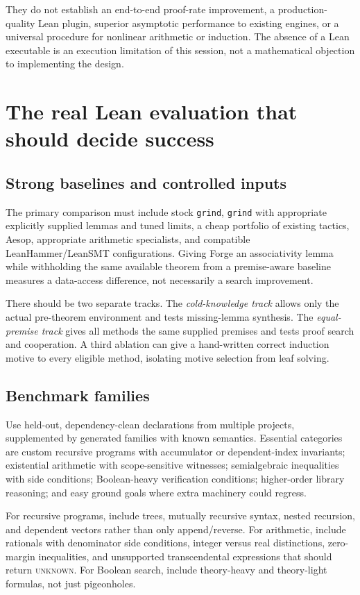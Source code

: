 \documentclass[11pt,letterpaper]{article}
\newcommand{\code}[1]{\texttt{#1}}
\newcommand{\Forge}{\textsf{Forge}}
\newcommand{\Unknown}{\textsc{unknown}}
\theoremstyle{definition}\newtheorem{definition}[theorem]{Definition}
\theoremstyle{remark}\newtheorem{remark}[theorem]{Remark}
\begin{document}
They do not establish an end-to-end proof-rate improvement, a production-quality Lean plugin, superior asymptotic performance to existing engines, or a universal procedure for nonlinear arithmetic or induction. The absence of a Lean executable is an execution limitation of this session, not a mathematical objection to implementing the design.

\section{The real Lean evaluation that should decide success}
\subsection{Strong baselines and controlled inputs}
The primary comparison must include stock \code{grind}, \code{grind} with appropriate explicitly supplied lemmas and tuned limits, a cheap portfolio of existing tactics, Aesop, appropriate arithmetic specialists, and compatible LeanHammer/LeanSMT configurations. Giving \Forge{} an associativity lemma while withholding the same available theorem from a premise-aware baseline measures a data-access difference, not necessarily a search improvement.

There should be two separate tracks. The \emph{cold-knowledge track} allows only the actual pre-theorem environment and tests missing-lemma synthesis. The \emph{equal-premise track} gives all methods the same supplied premises and tests proof search and cooperation. A third ablation can give a hand-written correct induction motive to every eligible method, isolating motive selection from leaf solving.

\subsection{Benchmark families}
Use held-out, dependency-clean declarations from multiple projects, supplemented by generated families with known semantics. Essential categories are custom recursive programs with accumulator or dependent-index invariants; existential arithmetic with scope-sensitive witnesses; semialgebraic inequalities with side conditions; Boolean-heavy verification conditions; higher-order library reasoning; and easy ground goals where extra machinery could regress.

For recursive programs, include trees, mutually recursive syntax, nested recursion, and dependent vectors rather than only append/reverse. For arithmetic, include rationals with denominator side conditions, integer versus real distinctions, zero-margin inequalities, and unsupported transcendental expressions that should return \Unknown. For Boolean search, include theory-heavy and theory-light formulas, not just pigeonholes.
\end{document}
